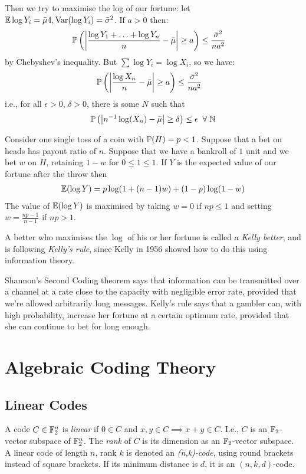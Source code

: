 \documentclass[10pt,a4paper]{article}
\begin{document}
Then we try to maximise the log of our fortune: let $\E\log Y_i = \bar{\mu}4, \Var(\log Y_i) = \bar{\sigma}^2$. If $a > 0$ then:
\begin{align*}
\P\left(\left| \frac{\log Y_1+\ldots + \log Y_n}{n} - \bar{\mu}\right|\geq a\right) & \leq \frac{\bar{\sigma}^2}{na^2}
\end{align*}
by Chebyshev's inequality. But $\sum \log Y_i = \log X_i$, so we have:
\begin{align*}
\P\left(\left| \frac{\log X_n}{n} - \bar{\mu}\right|\geq a\right) & \leq \frac{\bar{\sigma}^2}{na^2}
\end{align*}
i.e., for all $\epsilon > 0$, $\delta > 0$, there is some $N$ such that
\begin{align*}
\P\left(\left| n^{-1}\log(X_n) - \bar{\mu}\right| \geq \delta\right) \leq \epsilon\;\;\forall\;\N
\end{align*}
\begin{lemma}
Consider one single toss of a coin with $\P(H) = p < 1$. Suppose that a bet on heads has payout ratio of $n$. Suppose that we have a bankroll of $1$ unit and we bet $w$ on $H$, retaining $1-w$ for $0\leq 1 \leq 1$. If $Y$ is the expected value of our fortune after the throw then
\begin{align*}
\E(\log Y) = p\log(1+(n-1)w) + (1-p)\log(1-w)
\end{align*}
The value of $\E(\log Y)$ is maximised by taking $w = 0$ if $np \leq 1$ and setting $w = \frac{np-1}{n-1}$ if $np > 1$.
\end{lemma}
A better who maximises the $\log$ of his or her fortune is called a \emph{Kelly better}, and is following \emph{Kelly's rule}, since Kelly in 1956 showed how to do this using information theory.

Shannon's Second Coding theorem says that information can be transmitted over a channel at a rate close to the capacity with negligible error rate, provided that we're allowed arbitrarily long messages. Kelly's rule says that a gambler can, with high probability, increase her fortune at a certain optimum rate, provided that she can continue to bet for long enough.

\section{Algebraic Coding Theory}
\subsection{Linear Codes}
A code $C \in \F_2^n$ is \emph{linear} if $0 \in C$ and $x, y \in C \implies x+y \in C$. I.e., $C$ is an $\F_2$-vector subspace of $\F_2^n$. The \emph{rank} of $C$ is its dimension as an $\F_2$-vector subspace. A linear code of length $n$, rank $k$ is denoted an \emph{(n,k)-code}, using round brackets instead of square brackets. If its minimum distance is $d$, it is an $(n,k,d)$-code.
\end{document}
